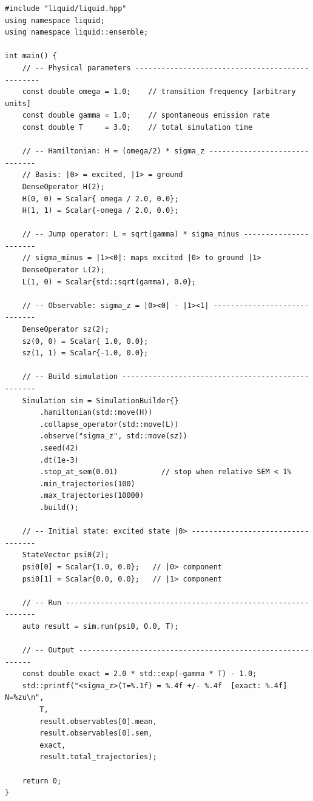 \documentclass[11pt,a4paper,twoside]{book}
\theoremstyle{definition}
\theoremstyle{remark}
\begin{document}
\begin{verbatim}
#include "liquid/liquid.hpp"
using namespace liquid;
using namespace liquid::ensemble;

int main() {
    // -- Physical parameters ------------------------------------------------
    const double omega = 1.0;    // transition frequency [arbitrary units]
    const double gamma = 1.0;    // spontaneous emission rate
    const double T     = 3.0;    // total simulation time

    // -- Hamiltonian: H = (omega/2) * sigma_z ------------------------------
    // Basis: |0> = excited, |1> = ground
    DenseOperator H(2);
    H(0, 0) = Scalar{ omega / 2.0, 0.0};
    H(1, 1) = Scalar{-omega / 2.0, 0.0};

    // -- Jump operator: L = sqrt(gamma) * sigma_minus ----------------------
    // sigma_minus = |1><0|: maps excited |0> to ground |1>
    DenseOperator L(2);
    L(1, 0) = Scalar{std::sqrt(gamma), 0.0};

    // -- Observable: sigma_z = |0><0| - |1><1| -----------------------------
    DenseOperator sz(2);
    sz(0, 0) = Scalar{ 1.0, 0.0};
    sz(1, 1) = Scalar{-1.0, 0.0};

    // -- Build simulation --------------------------------------------------
    Simulation sim = SimulationBuilder{}
        .hamiltonian(std::move(H))
        .collapse_operator(std::move(L))
        .observe("sigma_z", std::move(sz))
        .seed(42)
        .dt(1e-3)
        .stop_at_sem(0.01)          // stop when relative SEM < 1%
        .min_trajectories(100)
        .max_trajectories(10000)
        .build();

    // -- Initial state: excited state |0> ----------------------------------
    StateVector psi0(2);
    psi0[0] = Scalar{1.0, 0.0};   // |0> component
    psi0[1] = Scalar{0.0, 0.0};   // |1> component

    // -- Run ---------------------------------------------------------------
    auto result = sim.run(psi0, 0.0, T);

    // -- Output -----------------------------------------------------------
    const double exact = 2.0 * std::exp(-gamma * T) - 1.0;
    std::printf("<sigma_z>(T=%.1f) = %.4f +/- %.4f  [exact: %.4f]  N=%zu\n",
        T,
        result.observables[0].mean,
        result.observables[0].sem,
        exact,
        result.total_trajectories);

    return 0;
}
\end{verbatim}
\end{document}
